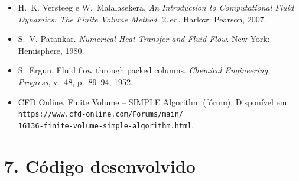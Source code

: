 \begin{itemize}
  \item[{[1]}] H.~K. Versteeg e W.~Malalasekera.
        \emph{An Introduction to Computational Fluid Dynamics: The Finite
        Volume Method}. 2.\,ed. Harlow: Pearson, 2007.
  \item[{[2]}] S.~V. Patankar.
        \emph{Numerical Heat Transfer and Fluid Flow}.
        New York: Hemisphere, 1980.
  \item[{[3]}] S.~Ergun.
        Fluid flow through packed columns.
        \emph{Chemical Engineering Progress}, v.~48, p.~89--94, 1952.
  \item[{[4]}] CFD Online. Finite Volume -- SIMPLE Algorithm (fórum).
        Disponível em:\\ \texttt{https://www.cfd-online.com/Forums/main/}\\
        \texttt{16136-finite-volume-simple-algorithm.html}.
\end{itemize}

\section*{7. Código desenvolvido}

